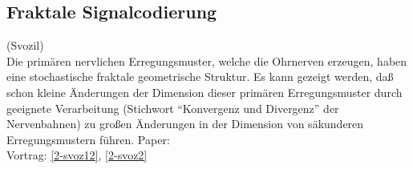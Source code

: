 \subsection{Fraktale Signalcodierung}
(Svozil)\\
Die prim\"aren nervlichen Erregungsmuster, welche die Ohrnerven
erzeugen, haben eine stochastische fraktale geometrische Struktur. Es
kann gezeigt werden, da\ss $\,$ schon kleine \"Anderungen der Dimension
dieser prim\"aren Erregungsmuster durch geeignete Verarbeitung
(Stichwort ``Konvergenz und Divergenz'' der Nervenbahnen) zu gro\ss en
\"Anderungen in der Dimension von s\"akunderen Erregungsmustern
f\"uhren.
Paper:
\\
Vortrag:
\ref{2-svoz12},
\ref{2-svoz2}
\\


